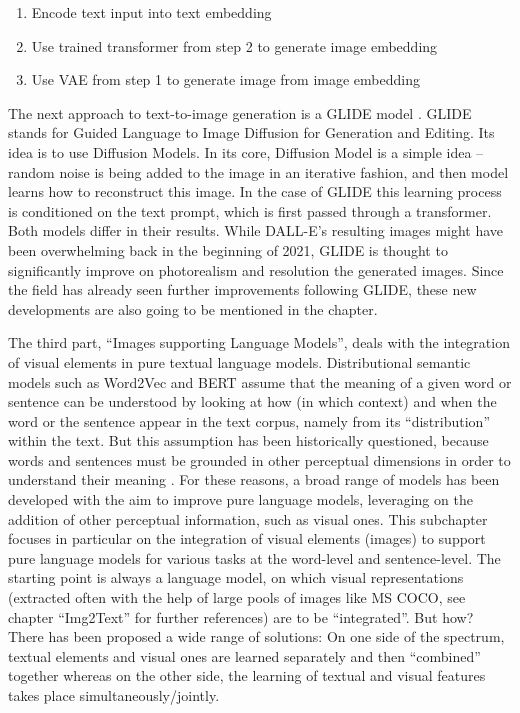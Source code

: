 \documentclass[
]{krantz}
\providecommand{\tightlist}{%
  \setlength{\itemsep}{0pt}\setlength{\parskip}{0pt}}
\begin{document}
\begin{enumerate}
\def\labelenumi{\arabic{enumi}.}
\tightlist
\item
  Encode text input into text embedding
\item
  Use trained transformer from step 2 to generate image embedding
\item
  Use VAE from step 1 to generate image from image embedding
\end{enumerate}

The next approach to text-to-image generation is a GLIDE model \citep{nichol2021glide}.
GLIDE stands for Guided Language to Image Diffusion for Generation and Editing.
Its idea is to use Diffusion Models.
In its core, Diffusion Model is a simple idea -- random noise is being added to the image in an iterative fashion, and then model learns how to reconstruct this image.
In the case of GLIDE this learning process is conditioned on the text prompt, which is first passed through a transformer.
Both models differ in their results.
While DALL-E's resulting images might have been overwhelming back in the beginning of 2021, GLIDE is thought to significantly improve on photorealism and resolution the generated images.
Since the field has already seen further improvements following GLIDE, these new developments are also going to be mentioned in the chapter.

The third part, ``Images supporting Language Models'', deals with the integration of visual elements in pure textual language models.
Distributional semantic models such as Word2Vec and BERT assume that the meaning of a given word or sentence can be understood by looking at how (in which context) and when the word or the sentence appear in the text corpus, namely from its ``distribution'' within the text.
But this assumption has been historically questioned, because words and sentences must be grounded in other perceptual dimensions in order to understand their meaning \citep[see for example the ``symbol grounding problem'';][]{harnad1990symbol}.
For these reasons, a broad range of models has been developed with the aim to improve pure language models, leveraging on the addition of other perceptual information, such as visual ones.
This subchapter focuses in particular on the integration of visual elements (images) to support pure language models for various tasks at the word-level and sentence-level.
The starting point is always a language model, on which visual representations (extracted often with the help of large pools of images like MS COCO, see chapter ``Img2Text'' for further references) are to be ``integrated''.
But how?
There has been proposed a wide range of solutions:
On one side of the spectrum, textual elements and visual ones are learned separately and then ``combined'' together whereas on the other side, the learning of textual and visual features takes place simultaneously/jointly.
\end{document}
